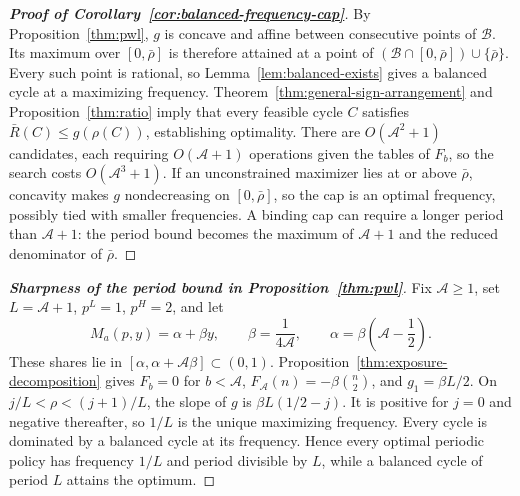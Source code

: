 \begingroup\color{black}
\begin{proof}[\normalfont\bfseries Proof of Corollary~\ref{cor:balanced-frequency-cap}]
By Proposition~\ref{thm:pwl}, \(g\) is concave and affine between consecutive points of \(\mathcal B\). Its maximum over \([0,\bar\rho]\) is therefore attained at a point of \((\mathcal B\cap[0,\bar\rho])\cup\{\bar\rho\}\). Every such point is rational, so Lemma~\ref{lem:balanced-exists} gives a balanced cycle at a maximizing frequency. Theorem~\ref{thm:general-sign-arrangement} and Proposition~\ref{thm:ratio} imply that every feasible cycle \(C\) satisfies \(\bar R(C)\le g(\rho(C))\), establishing optimality. There are \(O(\mathcal A^2+1)\) candidates, each requiring \(O(\mathcal A+1)\) operations given the tables of \(F_b\), so the search costs \(O(\mathcal A^3+1)\). If an unconstrained maximizer lies at or above \(\bar\rho\), concavity makes \(g\) nondecreasing on \([0,\bar\rho]\), so the cap is an optimal frequency, possibly tied with smaller frequencies. A binding cap can require a longer period than \(\mathcal A+1\): the period bound becomes the maximum of \(\mathcal A+1\) and the reduced denominator of \(\bar\rho\).
\end{proof}

\par\endgroup

\hypertarget{proof-sharp-period}{}
\begin{proof}[\normalfont\bfseries Sharpness of the period bound in Proposition~\ref{thm:pwl}]
Fix \(\mathcal A\ge1\), set \(L=\mathcal A+1\), \(p^L=1\), \(p^H=2\), and let
\[
 M_a(p,y)=\alpha+\beta y,\qquad
 \beta=\frac1{4\mathcal A},\qquad
 \alpha=\beta\left(\mathcal A-\frac12\right).
\]
These shares lie in \([\alpha,\alpha+\mathcal A\beta]\subset(0,1)\). Proposition~\ref{thm:exposure-decomposition} gives \(F_b=0\) for \(b<\mathcal A\), \(F_{\mathcal A}(n)=-\beta\binom n2\), and \(g_1=\beta L/2\). On \(j/L<\rho<(j+1)/L\), the slope of \(g\) is \(\beta L(1/2-j)\). It is positive for \(j=0\) and negative thereafter, so \(1/L\) is the unique maximizing frequency. Every cycle is dominated by a balanced cycle at its frequency. Hence every optimal periodic policy has frequency \(1/L\) and period divisible by \(L\), while a balanced cycle of period \(L\) attains the optimum.
\end{proof}

